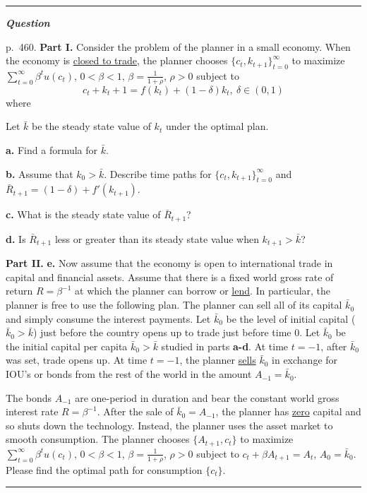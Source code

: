\documentclass[12pt, letterpaper]{article}
\newenvironment{longquestion}{\par\small\noindent\textcolor{gray!60}{\rule{\linewidth}{0.4pt}}\par\nobreak
  \noindent\textcolor{gray!60!black}{\bfseries\textit{Question}}\par\nobreak}{\par\noindent
  \textcolor{gray!60}{\rule{\linewidth}{0.4pt}}\par}
\begin{document}
\begin{tcolorbox}[evenbox,title={Exercise 11.8 \quad Trade and growth, version II}]
\begin{longquestion}
p.~460. \textbf{Part I.} Consider the problem of the planner in a small economy. When the economy is \underline{closed
to trade}, the planner chooses $\{c_t,k_{t+1}\}_{t=0}^\infty$ to maximize $\sum_{t=0}^\infty\beta^tu(c_t)$, $0<\beta<1$,
$\beta=\frac1{1+\rho}$, $\rho>0$ subject to
\[
c_t+k_t+1=f(k_t)+(1-\delta)k_t,\ \delta\in(0,1)
\]
where

Let $\bar k$ be the steady state value of $k_t$ under the optimal plan.

\textbf{a.} Find a formula for $\bar k$.

\textbf{b.} Assume that $k_0>\bar k$. Describe time paths for $\{c_t,k_{t+1}\}_{t=0}^\infty$ and
$\bar R_{t+1}=(1-\delta)+f'(k_{t+1})$.

\textbf{c.} What is the steady state value of $\bar R_{t+1}$?

\textbf{d.} Is $\bar R_{t+1}$ less or greater than its steady state value when $k_{t+1}>\bar k$?

\textbf{Part II.} \textbf{e.} Now assume that the economy is open to international trade in capital and financial assets.
Assume that there is a fixed world gross rate of return $R=\beta^{-1}$ at which the planner can borrow or
\underline{lend}. In particular, the planner is free to use the following plan. The planner can sell all of its capital
$\bar k_0$ and simply consume the interest payments. Let $\bar k_0$ be the level of initial capital ($\bar k_0>\bar k$)
just before the country opens up to trade just before time 0. Let $\bar k_0$ be the initial capital per capita
$\bar k_0>\bar k$ studied in parts \textbf{a-d}. At time $t=-1$, after $\bar k_0$ was set, trade opens up. At time
$t=-1$, the planner \underline{sells} $\bar k_0$ in exchange for IOU's or bonds from the rest of the world in the amount
$A_{-1}=\bar k_0$.

The bonds $A_{-1}$ are one-period in duration and bear the constant world gross interest rate $R=\beta^{-1}$. After the
sale of $\bar k_0=A_{-1}$, the planner has \underline{zero} capital and so shuts down the technology. Instead, the planner
uses the asset market to smooth consumption. The planner chooses $\{A_{t+1},c_t\}$ to maximize
$\sum_{t=0}^\infty\beta^tu(c_t)$, $0<\beta<1$, $\beta=\frac1{1+\rho}$, $\rho>0$ subject to $c_t+\beta A_{t+1}=A_t$,
$A_0=\bar k_0$. Please find the optimal path for consumption $\{c_t\}$.


\end{longquestion}
\end{tcolorbox}
\end{document}
